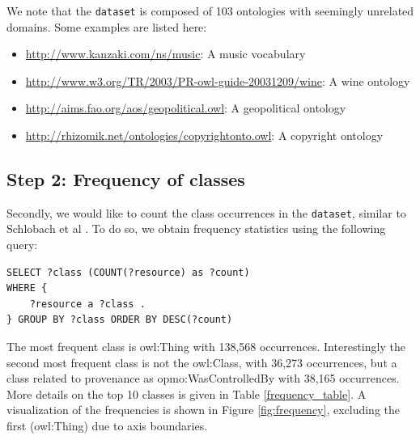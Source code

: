 \documentclass[runningheads,a4paper]{../../StyleFiles/llncs}
\begin{document}
We note that the \texttt{dataset} is composed of 103 ontologies with seemingly unrelated domains. Some examples are listed here:

\begin{itemize}
	\item \url{http://www.kanzaki.com/ns/music}: A music vocabulary
	\item \url{http://www.w3.org/TR/2003/PR-owl-guide-20031209/wine}: A wine ontology
	\item \url{http://aims.fao.org/aos/geopolitical.owl}: A geopolitical ontology
	\item \url{ http://rhizomik.net/ontologies/copyrightonto.owl}: A copyright ontology
\end{itemize}

\subsection{Step 2: Frequency of classes}
Secondly, we would like to count the class occurrences in the \texttt{dataset}, similar to Schlobach et al \cite{schlobach2007anytime}. To do so, we obtain frequency statistics using the following query:

\begin{lstlisting}[captionpos=b, caption=SPARQL query for getting class frequencies, label=lst:sparql, basicstyle=\ttfamily\small,frame=bt]
SELECT ?class (COUNT(?resource) as ?count) 
WHERE {
	?resource a ?class . 
} GROUP BY ?class ORDER BY DESC(?count)
\end{lstlisting}

The most frequent class is owl:Thing with 138,568 occurrences. Interestingly the second most frequent class is not the owl:Class, with 36,273 occurrences, but a class related to provenance as opmo:WasControlledBy with 38,165 occurrences. More details on the top 10 classes is given in Table \ref{frequency_table}. A visualization of the frequencies is shown in Figure \ref{fig:frequency}, excluding the first (owl:Thing) due to axis boundaries.
\end{document}
